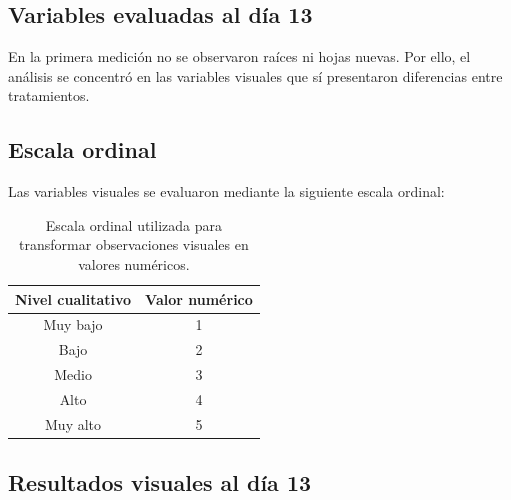 \subsection{Variables evaluadas al día 13}

En la primera medición no se observaron raíces ni hojas nuevas. Por ello, el análisis se concentró en las variables visuales que sí presentaron diferencias entre tratamientos.

\begin{table}[H]
\centering
{}
\caption{Variables visuales evaluadas al día 13.}
\end{table}

\subsection{Escala ordinal}

Las variables visuales se evaluaron mediante la siguiente escala ordinal:

\begin{table}[H]
\centering
\begin{tabular}{cc}
\hline
Nivel cualitativo & Valor numérico \\
\hline
Muy bajo & 1 \\
Bajo & 2 \\
Medio & 3 \\
Alto & 4 \\
Muy alto & 5 \\
\hline
\end{tabular}
\caption{Escala ordinal utilizada para transformar observaciones visuales en valores numéricos.}
\end{table}

\subsection{Resultados visuales al día 13}

